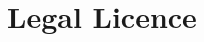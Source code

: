 \documentclass[ebook,12pt,oneside,openany]{memoir}
\begin{document}
% 
\chapter{Legal Licence}


\end{document}
